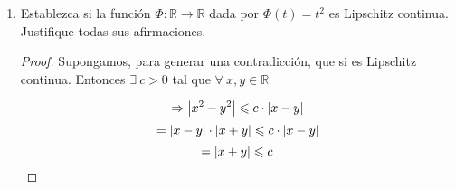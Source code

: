 \documentclass[12pt]{article}
\newcommand\R{\ensuremath{\mathbb{R}}}
\begin{document}
\begin{enumerate}[label=\textbf{\arabic*}.]
\begin{enumerate}
    \item $L$ es continua.
    \item $L$ es continua en 0.
    \item Existe $c > 0$ tal que $\norm{Lv}_W \leqslant c \cdot \norm{v}_V$ para todo $v \in V$
    \item $L$ es Lipschitz continua.
\end{enumerate}

\begin{proof}
    $(a) \Rightarrow (b)$ Como $L$ es continua en todos los puntos del dominio, es continua en $0$

    $(b) \Rightarrow (c)$

    Como $L$ es continua en 0, sean $\varepsilon > 0$ y $\delta>0$ tal que si $\norm{v-0}_V < \delta \Rightarrow \norm{Lv-0}_W < \epsilon$

    $\forall \: v \in V \Rightarrow$

    $$ \norm{\frac{\delta}{2{\norm{v}}_{V}} \cdot v}_V = \frac{\delta}{2} < \delta$$

    $$ \Rightarrow \norm{L\left(\frac{\delta}{2{\norm{v}}_{V}} \cdot v\right)}_W = \frac{\delta}{2{\norm{v}}_{V}} \cdot \norm{Lv}_W \leqslant \varepsilon$$

    Sea $c = \frac{2 \varepsilon}{\delta}$. Reordenando algebraicamente

    $$ \norm{Lv}_W \leqslant \varepsilon \cdot \frac{2}{\delta}{\norm{v}}_{V} = \norm{Lv}_W \leqslant c \cdot {\norm{v}}_{V}$$

    $(c) \Rightarrow (d)$

    $\forall \: v,  w \in V$

    $$\norm{Lv-Lw}_W = \norm{L(v-w)}_W \leqslant c \cdot \norm{v-w}_V$$

    Esto por el inciso anterior

    $(d) \Rightarrow (a)$ Trivial 
\end{proof}

\item Establezca si la función $\Phi : \R \to \R$ dada por
$\Phi(t) = t^2$ es Lipschitz continua. Justifique todas sus afirmaciones.

\begin{proof}
    Supongamos, para generar una contradicción, que si es Lipschitz continua. Entonces $\exists \: c > 0$ tal que $\forall \: x,y \in \R $

    $$\Rightarrow \abs{x^2-y^2} \leqslant c \cdot \abs{x-y}$$
    $$ = \abs{x-y} \cdot \abs{x+y} \leqslant c \cdot \abs{x-y}$$
    $$= \abs{x+y} \leqslant c$$


\end{proof}
\end{enumerate}
\end{document}
